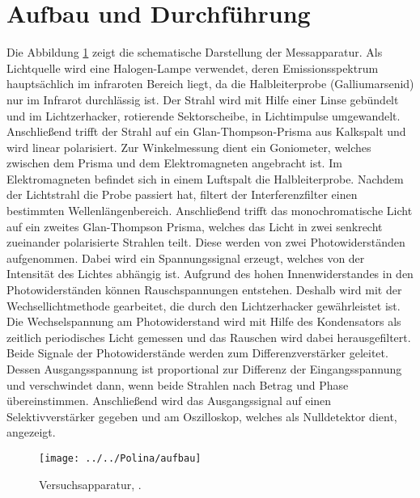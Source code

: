 \section{Aufbau und Durchführung}
Die Abbildung \ref{fig:aufbau} zeigt die schematische Darstellung der Messapparatur.  
Als Lichtquelle wird eine Halogen-Lampe verwendet, deren Emissionsspektrum hauptsächlich im infraroten Bereich liegt, da die Halbleiterprobe (Galliumarsenid) nur im Infrarot durchlässig ist. Der Strahl wird mit Hilfe einer Linse gebündelt und im Lichtzerhacker, rotierende Sektorscheibe, in Lichtimpulse umgewandelt. Anschließend trifft der Strahl auf ein Glan-Thompson-Prisma aus Kalkspalt und wird linear polarisiert. Zur Winkelmessung dient ein Goniometer, welches zwischen dem Prisma und dem Elektromagneten angebracht ist. Im Elektromagneten befindet sich in einem Luftspalt die Halbleiterprobe. Nachdem der Lichtstrahl die Probe passiert hat, filtert der Interferenzfilter einen bestimmten Wellenlängenbereich. Anschließend trifft das monochromatische Licht auf ein zweites Glan-Thompson Prisma, welches das Licht in zwei senkrecht zueinander polarisierte Strahlen teilt. Diese werden von zwei Photowiderständen aufgenommen. Dabei wird ein Spannungssignal erzeugt, welches von der Intensität des Lichtes abhängig ist. Aufgrund des hohen Innenwiderstandes in den Photowiderständen können Rauschspannungen entstehen. Deshalb wird mit der  Wechsellichtmethode gearbeitet, die durch den Lichtzerhacker gewährleistet ist. Die Wechselspannung am Photowiderstand wird mit Hilfe des Kondensators als zeitlich periodisches Licht gemessen und das Rauschen wird dabei herausgefiltert. Beide Signale der Photowiderstände werden zum Differenzverstärker geleitet. Dessen Ausgangsspannung ist proportional zur Differenz der Eingangsspannung und verschwindet dann, wenn beide Strahlen nach Betrag und Phase übereinstimmen. Anschließend wird das Ausgangssignal auf einen Selektivverstärker gegeben und am Oszilloskop, welches als Nulldetektor dient, angezeigt.

\begin{figure}[h!]
	\centering
	\texttt{[image: ../../Polina/aufbau]}
	\caption{Versuchsapparatur, \cite{anleitungV46}.}
	\label{fig:aufbau}
\end{figure}


